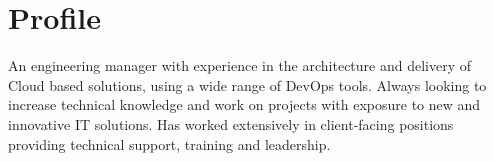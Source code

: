 \section{Profile}

An engineering manager with experience in the architecture 
and delivery of Cloud based solutions, using a wide 
range of DevOps tools. Always looking to increase technical 
knowledge and work on projects with exposure to new and innovative 
IT solutions. Has worked extensively in client-facing positions 
providing technical support, training and leadership.

\closesection{}
